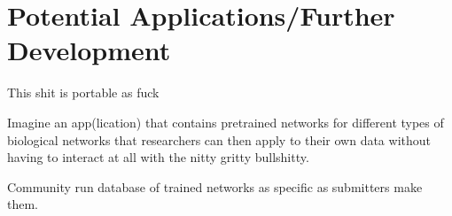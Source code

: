 \section{Potential Applications/Further Development}

This shit is portable as fuck

Imagine an app(lication) that contains pretrained networks for different types 
of biological networks that researchers can then apply to their own data without 
having to interact at all with the nitty gritty bullshitty.

Community run database of trained networks as specific as submitters make them.
